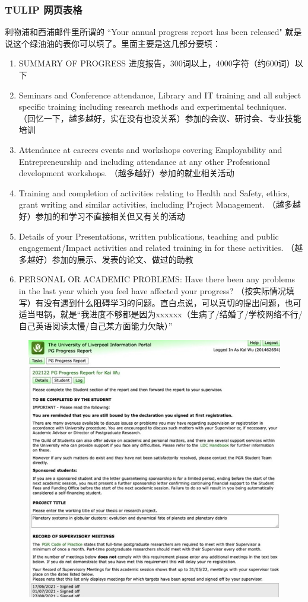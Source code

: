 \subsubsection{TULIP 网页表格}
利物浦和西浦邮件里所谓的 “Your annual progress report has been released" 就是说这个绿油油的表你可以填了。里面主要是这几部分要填：
\begin{enumerate}
    \item SUMMARY OF PROGRESS 进度报告，300词以上，4000字符（约600词）以下
    \item Seminars and Conference attendance, Library and IT training and all subject specific training including research methods and experimental techniques. （回忆一下，越多越好，实在没有也没关系）参加的会议、研讨会、专业技能培训
    \item Attendance at careers events and workshops covering Employability and Entrepreneurship and including attendance at any other Professional development workshops. （越多越好）参加的就业相关活动
    \item Training and completion of activities relating to Health and Safety, ethics, grant writing and similar activities, including Project Management. （越多越好）参加的和学习不直接相关但又有关的活动
    \item Details of your Presentations, written publications, teaching and public engagement/Impact activities and related training in for these activities. （越多越好）参加的展示、发表的论文、做过的助教
    \item PERSONAL OR ACADEMIC PROBLEMS: Have there been any problems in the last year which you feel have affected your progress? （按实际情况填写）有没有遇到什么阻碍学习的问题。直白点说，可以真切的提出问题，也可适当甩锅，就是“我进度不够都是因为xxxxxx（生病了/结婚了/学校网络不行/自己英语阅读太慢/自己某方面能力欠缺）”
\end{enumerate}

\begin{figure}[H]
    \includegraphics[width=0.7\columnwidth, center]{author-folder/Kai.Wu/TULIP.jpg}
\end{figure}


